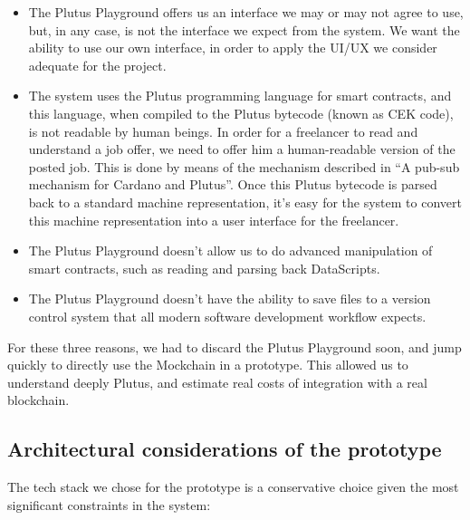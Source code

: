 \documentclass{article}
\begin{document}
\begin{itemize}
  \item The Plutus Playground offers us an interface we may or may not agree to use, but, in any case, is not the interface we expect from the system. We want the ability to use our own interface, in order to apply the UI/UX we consider adequate for the project.
  \item The system uses the Plutus programming language for smart contracts, and this language, when compiled to the Plutus bytecode (known as CEK code), is not readable by human beings. In order for a freelancer to read and understand a job offer, we need to offer him a human-readable version of the posted job. This is done by means of the mechanism described in ``A pub-sub mechanism for Cardano and Plutus''\cite{pub-sub-paper}. Once this Plutus bytecode is parsed back to a standard machine representation, it's easy for the system to convert this machine representation into a user interface for the freelancer.
  \item The Plutus Playground doesn't allow us to do advanced manipulation of smart contracts, such as reading and parsing back DataScripts.
  \item The Plutus Playground doesn't have the ability to save files to a version control system that all modern software development workflow expects.
\end{itemize}

For these three reasons, we had to discard the Plutus Playground soon, and jump quickly to directly use the Mockchain in a prototype. This allowed us to understand deeply Plutus, and estimate real costs of integration with a real blockchain.

\subsection{Architectural considerations of the prototype}
The tech stack we chose for the prototype is a conservative choice given the most significant constraints in the system:
\end{document}
